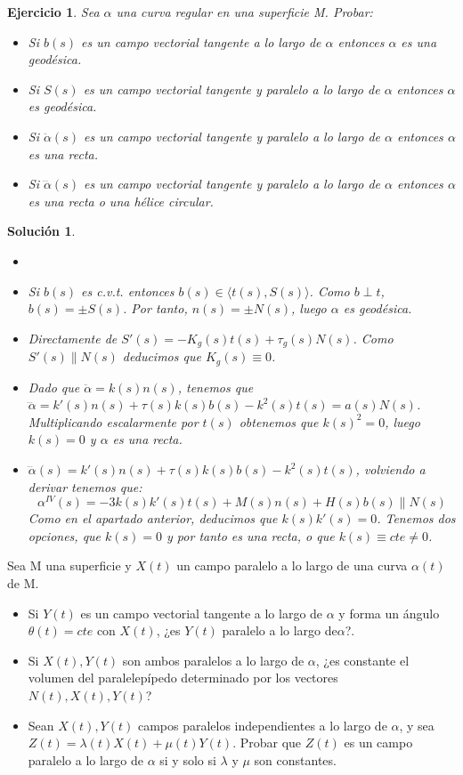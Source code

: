 \documentclass{article}
\theoremstyle{plain}
\newtheorem{exercise}{Ejercicio}
\newtheorem*{sol*}{Solución}
\providecommand{\gene}[1]{\langle{#1}\rangle}
\newenvironment{ejercicio}[2][Estado]{\begin{trivlist}
\item[\hskip \labelsep {\bfseries Ejercicio}\hskip \labelsep {\bfseries #2.}]}{\end{trivlist}}
\begin{document}
\newpage
\begin{exercise}
Sea $\alpha$ una curva regular en una superficie M. Probar:
\begin{itemize}
\item Si $b(s)$ es un campo vectorial tangente a lo largo de $\alpha$ entonces $\alpha$ es una geodésica.
\item Si $S(s)$ es un campo vectorial tangente y paralelo a lo largo de $\alpha$ entonces $\alpha$ es geodésica.
\item Si $\ddot{\alpha}(s)$ es un campo vectorial tangente y paralelo a lo largo de $\alpha$ entonces $\alpha$ es una recta.
\item Si $\dddot{\alpha}(s)$ es un campo vectorial tangente y paralelo a lo largo de $\alpha$ entonces $\alpha$ es una recta o una hélice circular.
\end{itemize}
\end{exercise}
\begin{sol*}
\begin{itemize}
\item[]
\item Si $b(s)$ es c.v.t. entonces $b(s)\in\gene{t(s),S(s)}$. Como $b\perp t$, $b(s)=\pm S(s)$. Por tanto, $n(s)=\pm N(s)$, luego $\alpha$ es geodésica.
\item Directamente de $S'(s)=-K_g(s)t(s)+\tau_g(s)N(s)$. Como $S'(s)\parallel N(s)$ deducimos que $K_g(s)\equiv 0$.
\item Dado que $\ddot{\alpha} = k(s)n(s)$, tenemos que $\dddot{\alpha}= k'(s)n(s)+\tau(s)k(s)b(s)-k^2(s)t(s) =a(s) N(s)$. Multiplicando escalarmente por $t(s)$ obtenemos que $k(s)^2 = 0$, luego $k(s)=0$ y $\alpha$ es una recta.
\item $\dddot{\alpha}(s)= k'(s)n(s)+\tau(s)k(s)b(s)-k^2(s)t(s)$, volviendo a derivar tenemos que:
\[
\alpha^{IV}(s) = -3k(s)k'(s)t(s)+M(s)n(s) + H(s)b(s) \parallel N(s)
\]
Como en el apartado anterior, deducimos que $k(s)k'(s)=0$. Tenemos dos opciones, que $k(s)=0$ y por tanto es una recta, o que $k(s)\equiv cte \neq 0$.
\end{itemize}
\end{sol*}
\newpage
\begin{ejercicio}{8} Sea M una superficie y $X(t)$ un campo paralelo a lo largo de una curva $\alpha(t)$ de M. 
\begin{itemize}
\item Si $Y(t)$ es un campo vectorial tangente a lo largo de $\alpha$ y forma un ángulo $\theta(t) = cte$ con $X(t)$, ¿es $Y (t)$ paralelo a lo largo de$\alpha$?.
\item Si $X(t),Y (t)$ son ambos paralelos a lo largo de $\alpha$, ¿es constante el volumen del paralelepípedo determinado por los vectores $N(t),X(t),Y (t)$?
\item Sean $ X(t),Y (t)$ campos paralelos independientes a lo largo de $\alpha$, y sea $Z(t) = \lambda(t)X(t)+\mu (t)Y (t)$. Probar que $Z(t)$ es un campo paralelo a lo largo de $\alpha$ si y solo si $\lambda$ y $\mu$ son constantes.
\end{itemize}
\end{ejercicio}
\end{document}
